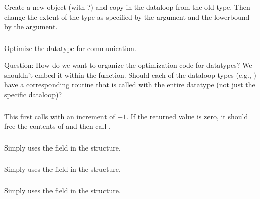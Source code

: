 \documentclass{article}
\begin{document}
\subsubsection{}

\subsubsection{}
Create a new object (with ?) and copy in the
dataloop from the old type.  Then change the extent of the type as specified
by the  argument and the lowerbound by the  argument.

\subsubsection{}
Optimize the datatype for communication.  

Question:  How do we want to organize the optimization code for datatypes?  We
shouldn't embed it within the  function.  Should each of
the dataloop types (e.g., ) have a corresponding routine
that is called with the entire datatype (not just the specific dataloop)?

\subsubsection{}
This first calls  with an increment of $-1$.  If
the returned value is zero, it should free the contents of  and
then call .

\subsubsection{}
Simply uses the  field in the structure.

\subsubsection{}
Simply uses the  field in the structure.

\subsubsection{}
Simply uses the  field in the structure.
\end{document}
